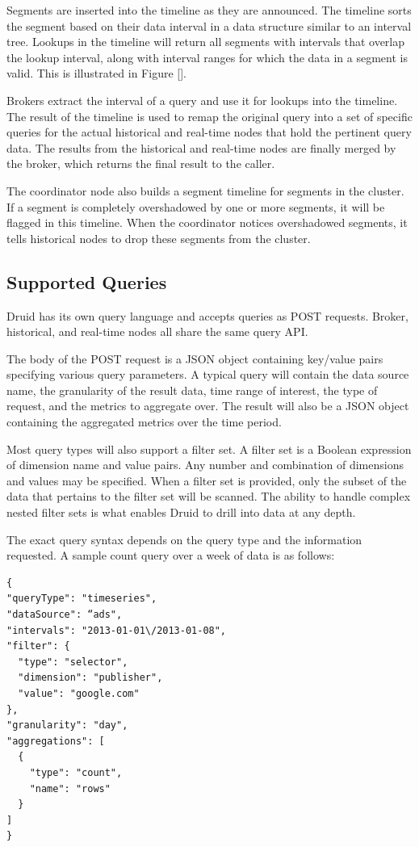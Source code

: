 \documentclass{vldb}
\begin{document}
Segments are inserted into the timeline as they are announced. The timeline
sorts the segment based on their data interval in a data structure similar to
an interval tree. Lookups in the timeline will return all segments with
intervals that overlap the lookup interval, along with interval ranges for
which the data in a segment is valid. This is illustrated in Figure [].

Brokers extract the interval of a query and use it for lookups into the
timeline. The result of the timeline is used to remap the original query into a
set of specific queries for the actual historical and real-time nodes that hold
the pertinent query data. The results from the historical and real-time nodes
are finally merged by the broker, which returns the final result to the caller.

The coordinator node also builds a segment timeline for segments in the
cluster. If a segment is completely overshadowed by one or more segments, it
will be flagged in this timeline. When the coordinator notices overshadowed
segments, it tells historical nodes to drop these segments from the cluster.

\subsection{Supported Queries}
Druid has its own query language and accepts queries as POST requests. Broker,
historical, and real-time nodes all share the same query API. 

The body of the POST request is a JSON object containing key/value pairs
specifying various query parameters. A typical query will contain the data
source name, the granularity of the result data, time range of interest, the
type of request, and the metrics to aggregate over. The result will also be a
JSON object containing the aggregated metrics over the time period. 

Most query types will also support a filter set. A filter set is a Boolean
expression of dimension name and value pairs. Any number and combination of
dimensions and values may be specified. When a filter set is provided, only the
subset of the data that pertains to the filter set will be scanned. The ability
to handle complex nested filter sets is what enables Druid to drill into data
at any depth. 

The exact query syntax depends on the query type and the information requested.
A sample count query over a week of data is as follows: 

{\scriptsize\begin{verbatim}
{
"queryType": "timeseries",
"dataSource": “ads",
"intervals": "2013-01-01\/2013-01-08",
"filter": {
  "type": "selector",
  "dimension": "publisher",
  "value": "google.com"
},
"granularity": "day",
"aggregations": [
  {
    "type": "count",
    "name": "rows"
  }
]
}
\end{verbatim}}
\end{document}
